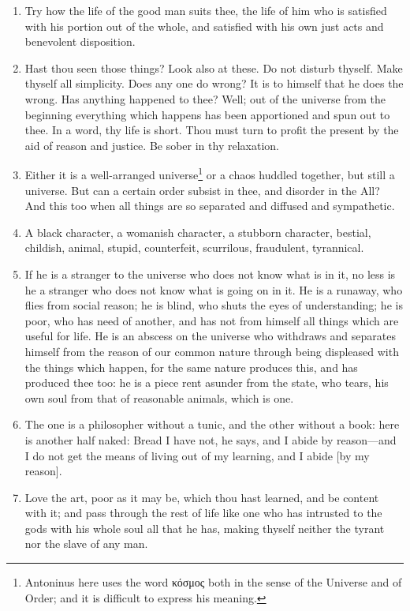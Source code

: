 \begin{enumerate}
\item Try how the life of the good man suits thee, the life of him who is satisfied with his portion out of the whole, and satisfied with his own just acts and benevolent disposition.

\item Hast thou seen those things? Look also at these. Do not disturb thyself. Make thyself all simplicity. Does any one do wrong? It is to himself that he does the wrong. Has anything happened to thee? Well; out of the universe from the beginning everything which happens has been apportioned and spun out to thee. In a word, thy life is short. Thou must turn to profit the present by the aid of reason and justice. Be sober in thy relaxation.

\item Either it is a well-arranged universe\footnote{Antoninus here uses the word \textgreek{κόσμος} both in the sense of the Universe and of Order; and it is difficult to express his meaning.} or a chaos huddled together, but still a universe. But can a certain order subsist in thee, and disorder in the All? And this too when all things are so separated and diffused and sympathetic.

\item A black character, a womanish character, a stubborn character, bestial, childish, animal, stupid, counterfeit, scurrilous, fraudulent, tyrannical.

\item If he is a stranger to the universe who does not know what is in it, no less is he a stranger who does not know what is going on in it. He is a runaway, who flies from social reason; he is blind, who shuts the eyes of understanding; he is poor, who has need of another, and has not from himself all things which are useful for life. He is an abscess on the universe who withdraws and separates himself from the reason of our common nature through being displeased with the things which happen, for the same nature produces this, and has produced thee too: he is a piece rent asunder from the state, who tears, his own soul from that of reasonable animals, which is one.

\item The one is a philosopher without a tunic, and the other without a book: here is another half naked: Bread I have not, he says, and I abide by reason—and I do not get the means of living out of my learning, and I abide [{\clarify by my reason}].

\item Love the art, poor as it may be, which thou hast learned, and be content with it; and pass through the rest of life like one who has intrusted to the gods with his whole soul all that he has, making thyself neither the tyrant nor the slave of any man.


\end{enumerate}
